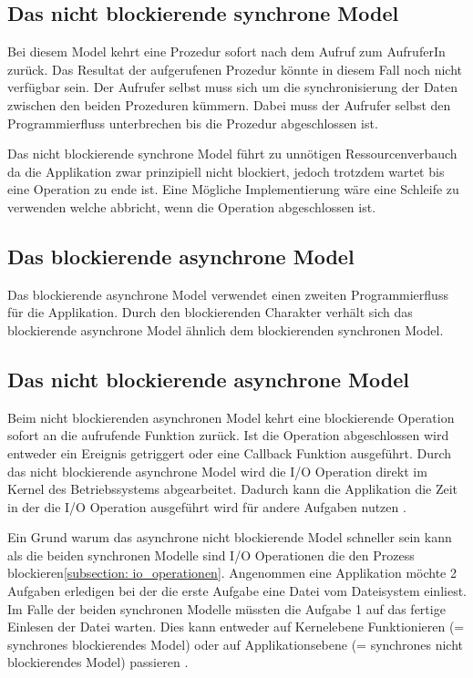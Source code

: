 \subsection{Das nicht blockierende synchrone Model}

Bei diesem Model kehrt eine Prozedur sofort nach dem Aufruf zum AufruferIn zurück. Das Resultat der aufgerufenen Prozedur könnte in diesem Fall noch nicht verfügbar sein. Der Aufrufer selbst muss sich um die synchronisierung der Daten zwischen den beiden Prozeduren kümmern. Dabei muss der Aufrufer selbst den Programmierfluss unterbrechen bis die Prozedur abgeschlossen ist. 

Das nicht blockierende synchrone Model führt zu unnötigen Ressourcenverbauch da die Applikation zwar prinzipiell nicht blockiert, jedoch trotzdem wartet bis eine Operation zu ende ist. Eine Mögliche Implementierung wäre eine Schleife zu verwenden welche abbricht, wenn die Operation abgeschlossen ist.\cite[p. 48]{Erb2012}

\subsection{Das blockierende asynchrone Model}

Das blockierende asynchrone Model verwendet einen zweiten Programmierfluss für die Applikation. Durch den blockierenden Charakter verhält sich das blockierende asynchrone Model ähnlich dem blockierenden synchronen Model. 

\subsection{Das nicht blockierende asynchrone Model}
Beim nicht blockierenden asynchronen Model kehrt eine blockierende Operation sofort an die aufrufende Funktion zurück. Ist die Operation abgeschlossen wird entweder ein Ereignis getriggert oder eine Callback Funktion ausgeführt. Durch das nicht blockierende asynchrone Model wird die I/O Operation direkt im Kernel des Betriebssystems abgearbeitet. Dadurch kann die Applikation die Zeit in der die I/O Operation ausgeführt wird für andere Aufgaben nutzen \cite[p. 48]{Erb2012}.

Ein Grund warum das asynchrone nicht blockierende Model schneller sein kann als die beiden synchronen Modelle sind I/O Operationen die den Prozess blockieren\ref{subsection: io_operationen}. Angenommen eine Applikation möchte 2 Aufgaben erledigen bei der die erste Aufgabe eine Datei vom Dateisystem einliest. Im Falle der beiden synchronen Modelle müssten die Aufgabe 1 auf das fertige Einlesen der Datei warten. Dies kann entweder auf Kernelebene Funktionieren (= synchrones blockierendes Model) oder auf Applikationsebene (= synchrones nicht blockierendes Model) passieren \cite[]{Pet2015}. 

